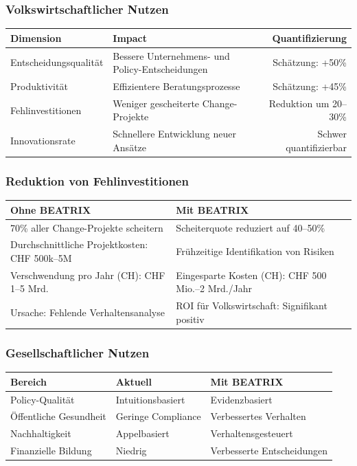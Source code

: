 \documentclass[11pt,a4paper]{article}
\begin{document}
\subsubsection{Volkswirtschaftlicher Nutzen}

\begin{table}[h]
\centering
\begin{tabularx}{\textwidth}{lXr}
\toprule
\textbf{Dimension} & \textbf{Impact} & \textbf{Quantifizierung} \\
\midrule
Entscheidungsqualität & Bessere Unternehmens- und Policy-Entscheidungen & Schätzung: +50\% \\
Produktivität & Effizientere Beratungsprozesse & Schätzung: +45\% \\
Fehlinvestitionen & Weniger gescheiterte Change-Projekte & Reduktion um 20--30\% \\
Innovationsrate & Schnellere Entwicklung neuer Ansätze & Schwer quantifizierbar \\
\bottomrule
\end{tabularx}
\end{table}

\subsubsection{Reduktion von Fehlinvestitionen}

\begin{table}[h]
\centering
\begin{tabular}{ll}
\toprule
\textbf{Ohne BEATRIX} & \textbf{Mit BEATRIX} \\
\midrule
70\% aller Change-Projekte scheitern & Scheiterquote reduziert auf 40--50\% \\
Durchschnittliche Projektkosten: CHF 500k--5M & Frühzeitige Identifikation von Risiken \\
Verschwendung pro Jahr (CH): CHF 1--5 Mrd. & Eingesparte Kosten (CH): CHF 500 Mio.--2 Mrd./Jahr \\
Ursache: Fehlende Verhaltensanalyse & ROI für Volkswirtschaft: Signifikant positiv \\
\bottomrule
\end{tabular}
\end{table}

\subsubsection{Gesellschaftlicher Nutzen}

\begin{table}[h]
\centering
\begin{tabular}{lll}
\toprule
\textbf{Bereich} & \textbf{Aktuell} & \textbf{Mit BEATRIX} \\
\midrule
Policy-Qualität & Intuitionsbasiert & Evidenzbasiert \\
Öffentliche Gesundheit & Geringe Compliance & Verbessertes Verhalten \\
Nachhaltigkeit & Appelbasiert & Verhaltensgesteuert \\
Finanzielle Bildung & Niedrig & Verbesserte Entscheidungen \\
\bottomrule
\end{tabular}
\end{table}
\end{document}

